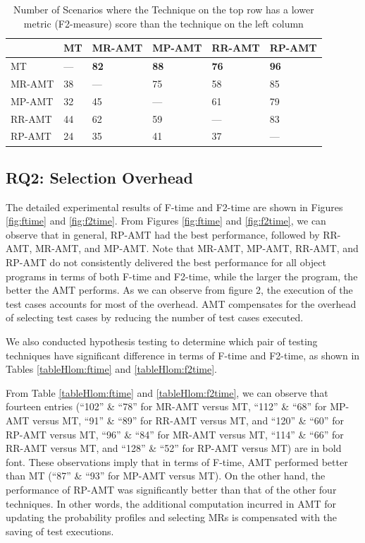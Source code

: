 \documentclass[10pt,journal,compsoc]{IEEEtran}
\begin{document}
\begin{table}[htbp]
  \caption{Number of Scenarios where the Technique on the top row has a lower metric (F2-measure) score than the technique on the left column}
  \centering
  \label{tableHlom:f2}
  \renewcommand\tabcolsep{4.0pt}
  \begin{tabular}{llllll}  \toprule
             &MT      &MR-AMT             &MP-AMT             &RR-AMT             &RP-AMT  \\ \midrule
    MT       &---     &\textbf{82}       &\textbf{88}         &\textbf{76}        &\textbf{96}     \\
    MR-AMT   &38      &---                &75                 &58                 &85  \\
    MP-AMT   &32      &45                 &---                &61                 &79 \\
    RR-AMT   &44      &62                 &59                 &---                &83 \\
    RP-AMT   &24      &35                 &41                 &37                 &--- \\ \bottomrule
  \end{tabular}
\end{table}

\subsection{RQ2: Selection Overhead}
\label{sec:rq2}

The detailed experimental results of F-time and F2-time are shown in Figures \ref{fig:ftime} and \ref{fig:f2time}. From Figures \ref{fig:ftime} and \ref{fig:f2time}, we can observe that in general, RP-AMT had the best performance, followed by RR-AMT, MR-AMT, and MP-AMT. Note that MR-AMT, MP-AMT, RR-AMT, and RP-AMT do not consistently delivered the best performance for all object programs in terms of both F-time and F2-time, while the larger the program, the better the AMT performs. As we can observe from figure 2, the execution of the test cases accounts for most of the overhead. AMT compensates for the overhead of selecting test cases by reducing the number of test cases executed.

We also conducted hypothesis testing to determine which pair of testing techniques have significant difference in terms of F-time and F2-time, as shown in Tables \ref{tableHlom:ftime} and \ref{tableHlom:f2time}.

From Table \ref{tableHlom:ftime} and \ref{tableHlom:f2time}, we can observe that fourteen entries (``102'' \& ``78'' for MR-AMT versus MT, ``112'' \& ``68'' for MP-AMT versus MT, ``91'' \& ``89'' for RR-AMT versus MT, and ``120'' \& ``60'' for RP-AMT versus MT, ``96'' \& ``84'' for MR-AMT versus MT, ``114'' \& ``66'' for RR-AMT versus MT, and ``128'' \& ``52'' for RP-AMT versus MT) are in bold font. These observations imply that in terms of F-time, AMT performed better than MT (``87'' \& ``93'' for MP-AMT versus MT). On the other hand, the performance of RP-AMT was significantly better than that of the other four techniques. In other words, the additional computation incurred in AMT for updating the probability profiles and selecting MRs is compensated with the saving of test executions.
\end{document}
